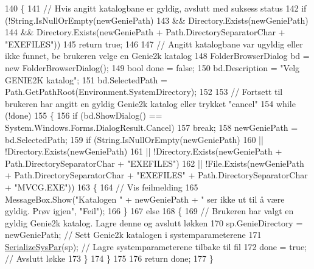 \begin{DoxyCode}
140         \{
141             \textcolor{comment}{// Hvis angitt katalogbane er gyldig, avslutt med suksess status}
142             \textcolor{keywordflow}{if} (!String.IsNullOrEmpty(newGeniePath)
143                 && Directory.Exists(newGeniePath)
144                 && Directory.Exists(newGeniePath + Path.DirectorySeparatorChar + \textcolor{stringliteral}{"EXEFILES"}))
145                 \textcolor{keywordflow}{return} \textcolor{keyword}{true};
146 
147             \textcolor{comment}{// Angitt katalogbane var ugyldig eller ikke funnet, be brukeren velge en Genie2k katalog}
148             FolderBrowserDialog bd = \textcolor{keyword}{new} FolderBrowserDialog();
149             \textcolor{keywordtype}{bool} done = \textcolor{keyword}{false};
150             bd.Description = \textcolor{stringliteral}{"Velg GENIE2K katalog"};
151             bd.SelectedPath = Path.GetPathRoot(Environment.SystemDirectory);
152 
153             \textcolor{comment}{// Fortsett til brukeren har angitt en gyldig Genie2k katalog eller trykket "cancel"}
154             \textcolor{keywordflow}{while} (!done)
155             \{
156                 \textcolor{keywordflow}{if} (bd.ShowDialog() == System.Windows.Forms.DialogResult.Cancel)
157                     \textcolor{keywordflow}{break};
158                 newGeniePath = bd.SelectedPath;
159                 \textcolor{keywordflow}{if} (String.IsNullOrEmpty(newGeniePath)
160                     || !Directory.Exists(newGeniePath)
161                     || !Directory.Exists(newGeniePath + Path.DirectorySeparatorChar + \textcolor{stringliteral}{"EXEFILES"})
162                     || !File.Exists(newGeniePath + Path.DirectorySeparatorChar + \textcolor{stringliteral}{"EXEFILES"} + 
      Path.DirectorySeparatorChar + \textcolor{stringliteral}{"MVCG.EXE"}))
163                 \{
164                     \textcolor{comment}{// Vis feilmelding}
165                     MessageBox.Show(\textcolor{stringliteral}{"Katalogen "} + newGeniePath + \textcolor{stringliteral}{" ser ikke ut til å være gyldig. Prøv
       igjen"}, \textcolor{stringliteral}{"Feil"});
166                 \}
167                 \textcolor{keywordflow}{else}
168                 \{
169                     \textcolor{comment}{// Brukeren har valgt en gyldig Genie2k katalog. Lagre denne og avslutt løkken}
170                     sp.GenieDirectory = newGeniePath; \textcolor{comment}{// Sett Genie2k katalogen i systemparameterene}
171                     \hyperlink{class_scintilab_1_1_utils_a1def7832ca47212a1d252c470572b234}{SerializeSysPar}(sp); \textcolor{comment}{// Lagre systemparameterene tilbake til fil}
172                     done = \textcolor{keyword}{true}; \textcolor{comment}{// Avslutt løkke}
173                 \}
174             \}
175 
176             \textcolor{keywordflow}{return} done;
177         \}
\end{DoxyCode}
